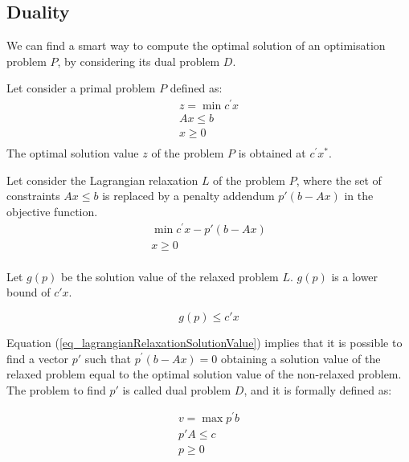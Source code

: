 \subsection{Duality} \label{secDuality}

We can find a smart way to compute the optimal solution of an optimisation problem $P$, by considering its dual problem $D$.\par

Let consider a primal problem $P$ defined as:
\begin{equation}
\begin{split}
    z=\min{c^\prime x}\\
    Ax\le b\\
    x\geq0\\
\end{split}
\label{eq_primalProblem1}
\end{equation}
The optimal solution value $z$ of the problem $P$ is obtained at $c^\prime x^\ast$.\par 

Let consider the Lagrangian relaxation $L$ of the problem $P$, where the set of constraints $Ax\le b$ is replaced by a penalty addendum $p\prime\left(b-Ax\right)$ in the objective function.
\begin{equation}
\begin{split}
    \min{c^\prime x-p\prime(b-Ax)}\\
    x\geq0\\
\end{split}
\label{eq_lagrangianRelaxation}
\end{equation}

Let $g(p)$ be the solution value of the relaxed problem $L$. $g(p)$ is a lower bound of $c\prime x$.

\begin{equation}
g\left(p\right)\le c\prime x
\label{eq_lagrangianRelaxationSolutionValue}
\end{equation}

Equation (\ref{eq_lagrangianRelaxationSolutionValue}) implies that it is possible to find a vector $p\prime$ such that $p^\prime\left(b-Ax\right)=0$ obtaining a solution value of the relaxed problem equal to the optimal solution value of the non-relaxed problem. The problem to find $p\prime$ is called dual problem $D$, and it is formally defined as:

\begin{equation}
\begin{split}
    v=\max{p^\prime b}\\
    p\prime A\le c\\
    p\geq0\\
\end{split}
\label{eq_dualProblem}
\end{equation}

